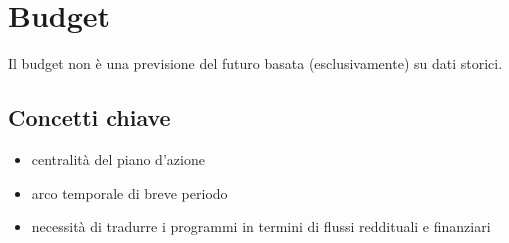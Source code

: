 \chapter{Budget}
Il \gls{budget} non è una previsione del futuro basata
(esclusivamente) su dati storici.
\section{Concetti chiave}
\begin{itemize}
    \item centralità del piano d’azione
    \item arco temporale di breve periodo
    \item necessità di tradurre i programmi in termini di flussi reddituali e
    finanziari
\end{itemize}